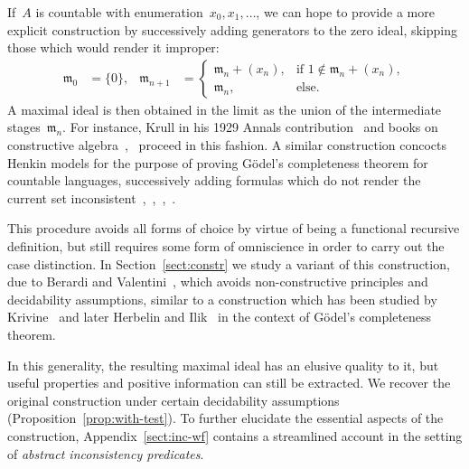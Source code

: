 \documentclass[envcountsect,envcountsame,runningheads]{llncs}
\newcommand{\mmm}{\mathfrak{m}}
\renewcommand{\_}{\mathpunct{.}\,}
\begin{document}
If~$A$ is countable with enumeration~$x_0,x_1,\ldots$, we can hope to provide a
more explicit construction by successively adding generators to the zero ideal,
skipping those which would render it improper:
\begin{align*}
  \mmm_0 &= \{ 0 \}, &
  \mmm_{n+1} &= \begin{cases}
    \mmm_n + (x_n), & \text{if $1 \not\in \mmm_n + (x_n)$}, \\
    \mmm_n, & \text{else.}
  \end{cases}
\end{align*}
A maximal ideal is then obtained in the limit as the union of the intermediate
stages~$\mmm_n$. For instance, Krull in his 1929 Annals contribution~\cite[Hilfs\-satz]{krull:ohne} and books on constructive
algebra~\cite[Lemma~VI.3.2]{mines-richman-ruitenburg:constructive-algebra},~\cite[comment after Theorem~VII.5.2]{lombardi-quitte:constructive-algebra} proceed in this fashion.
A similar
construction concocts Henkin models for the purpose of proving
Gödel's completeness theorem for countable languages, successively adding
formulas which do not render the current set
inconsistent~\cite[Satz~I.56]{tarski:fundamental},~\cite[Lemma~1.5.7]{dalen:logic},~\cite[Lemma~III.5.4]{simpson:subsystems},~\cite[Lemma~2.1]{ishihara-khoussainov-nerode:decidable-kripke-models}.

This procedure avoids all forms of choice by virtue of being a
functional recursive definition, but still requires some form of omniscience in
order to carry out the case distinction.
In Section~\ref{sect:constr} we study a variant of this construction, due to Berardi and
Valentini~\cite{berardi-valentini:krivine}, which
avoids non-constructive principles and decidability assumptions, similar to
a construction which has been studied by
Krivine~\cite[p.~410]{krivine:completeness} and later Herbelin and
Ilik~\cite[p.~11]{herbelin-ilik:henkin} in the
context of Gödel's completeness theorem.

In this generality, the resulting
maximal ideal has an elusive quality to it, but useful properties and positive information can still be
extracted. We recover the original construction under certain
decidability assumptions (Proposition~\ref{prop:with-test}). To further
elucidate the essential aspects of the construction, Appendix~\ref{sect:inc-wf}
contains a streamlined account in the setting of \emph{abstract inconsistency
predicates}.
\end{document}
